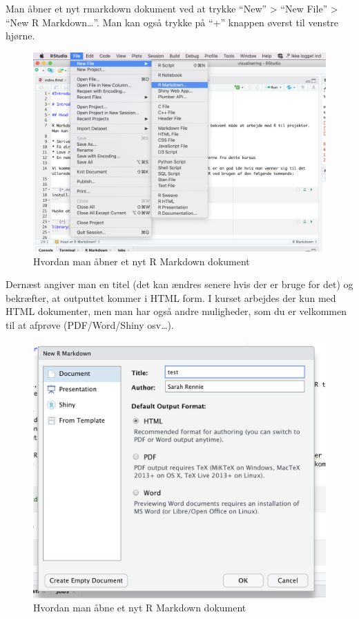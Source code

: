 \documentclass[
]{book}
\begin{document}
Man åbner et nyt rmarkdown dokument ved at trykke ``New'' \textgreater{} ``New File'' \textgreater{} ``New R Markdown\ldots{}''. Man kan også trykke på ``+'' knappen øverst til venstre hjørne.

\begin{figure}
\centering
\includegraphics{plots/open_new_rmarkdown.png}
\caption{Hvordan man åbner et nyt R Markdown dokument}
\end{figure}

Dernæst angiver man en titel (det kan ændres senere hvis der er bruge for det) og bekræfter, at outputtet kommer i HTML form. I kurset arbejdes der kun med HTML dokumenter, men man har også andre muligheder, som du er velkommen til at afprøve (PDF/Word/Shiny osv\ldots).

\begin{figure}
\centering
\includegraphics{plots/create_new_rmarkdown.png}
\caption{Hvordan man åbne et nyt R Markdown dokument}
\end{figure}
\end{document}
